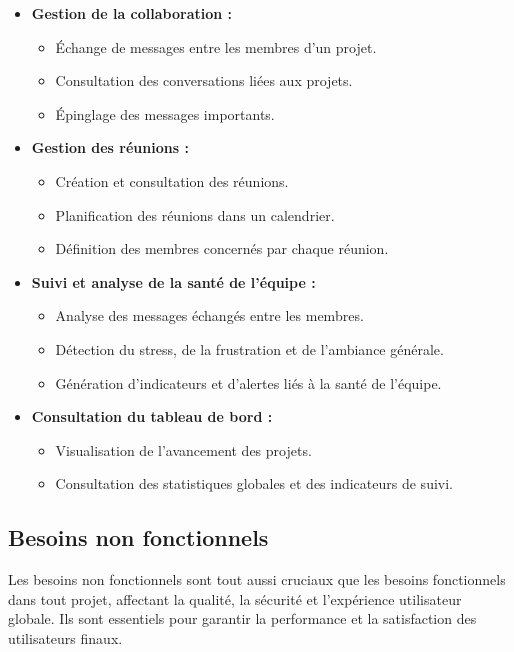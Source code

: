 \begin{itemize}
  \item[$\bullet$] \textbf{Gestion de la collaboration :}
        \begin{itemize}
          \item[$\circ$] Échange de messages entre les membres d'un projet.
          \item[$\circ$] Consultation des conversations liées aux projets.
          \item[$\circ$] Épinglage des messages importants.
        \end{itemize}

  \item[$\bullet$] \textbf{Gestion des réunions :}
        \begin{itemize}
          \item[$\circ$] Création et consultation des réunions.
          \item[$\circ$] Planification des réunions dans un calendrier.
          \item[$\circ$] Définition des membres concernés par chaque réunion.
        \end{itemize}

  \item[$\bullet$] \textbf{Suivi et analyse de la santé de l'équipe :}
        \begin{itemize}
          \item[$\circ$] Analyse des messages échangés entre les membres.
          \item[$\circ$] Détection du stress, de la frustration et de l'ambiance générale.
          \item[$\circ$] Génération d'indicateurs et d'alertes liés à la santé de l'équipe.
        \end{itemize}

  \item[$\bullet$] \textbf{Consultation du tableau de bord :}
        \begin{itemize}
          \item[$\circ$] Visualisation de l'avancement des projets.
          \item[$\circ$] Consultation des statistiques globales et des indicateurs de suivi.
        \end{itemize}
\end{itemize}

\subsection{Besoins non fonctionnels}
Les besoins non fonctionnels sont tout aussi cruciaux que les besoins fonctionnels dans tout projet, affectant la qualité, la sécurité et l'expérience utilisateur globale. Ils sont essentiels pour garantir la performance et la satisfaction des utilisateurs finaux.

